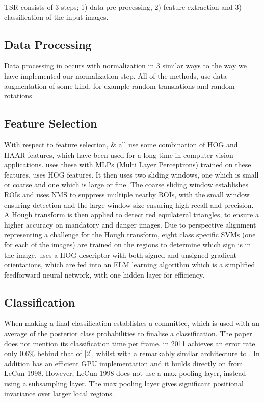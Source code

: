 \documentclass[conference]{IEEEtran}
\begin{document}
TSR consists of 3 steps; 1) data pre-processing, 2) feature extraction and 3) classification of the input images. 
\subsection{Data Processing}

Data processing in \cite{Paper1} occurs with normalization in 3 similar ways to the way we have implemented our normalization step. All of the methods, \cite{Paper1}\cite{Paper2}\cite{Paper3} use data augmentation of some kind, for example random translations and random rotations.

\subsection{Feature Selection} 

With respect to feature selection, \cite{Paper1}\cite{Paper2} \& \cite{Paper3} all use some combination of HOG and HAAR features, which have been used for a long time in computer vision applications. \cite{Paper1} uses these with MLPs (Multi Layer Perceptrons) trained on these features. \cite{Paper2} uses HOG features. It then uses two sliding windows, one which is small or coarse and one which is large or fine. The coarse sliding window establishes ROIs and uses NMS to suppress multiple nearby ROIs, with the small window ensuring detection and the large window size ensuring high recall and precision. A Hough transform is then applied to detect red equilateral triangles, to ensure a higher accuracy on mandatory and danger images. Due to perspective alignment representing a challenge for the Hough transform, eight class specific SVMs (one for each of the images) are trained on the regions to determine which sign is in the image. \cite{Paper3} uses a HOG descriptor with both signed and unsigned gradient orientations, which are fed into an ELM learning algorithm which is a simplified feedforward neural network, with one hidden layer for efficiency.

\subsection{Classification} 

When making a final classification \cite{Paper1} establishes a committee, which is used with an average of the posterior class probabilities to finalise a classification. The paper does not mention its classification time per frame. \cite{Paper1} in 2011 achieves an error rate only 0.6\% behind that of [2], whilst with a remarkably similar architecture to \cite{Paper1}. In addition \cite{Paper1} has an efficient GPU implementation and it builds directly on from LeCun 1998. However, LeCun 1998 does not use a max pooling layer, instead using a subsampling layer. The max pooling layer gives significant positional invariance over larger local regions.
\end{document}
